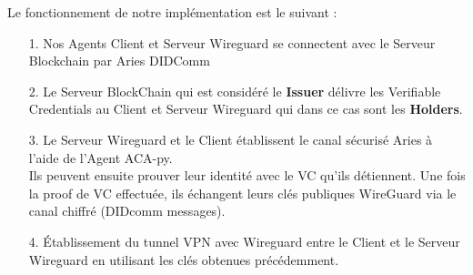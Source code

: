 \documentclass[12pt, openany]{report}
\begin{document}
\begin{flushleft}
Le fonctionnement de notre implémentation est le suivant : 

\begin{itemize}
\color{green}
\item[1.] \color{black} Nos Agents Client et Serveur Wireguard se connectent avec le Serveur Blockchain par Aries DIDComm

\color{orange}
\item[2.] \color{black} Le Serveur BlockChain qui est considéré le \textbf{Issuer} délivre les Verifiable Credentials au Client et Serveur Wireguard qui dans ce cas sont les \textbf{Holders}.

\color{violet}
\item[3.] \color{black} Le Serveur Wireguard et le Client établissent le canal sécurisé Aries à l’aide de l’Agent ACA-py.\\
Ils peuvent ensuite prouver leur identité avec le VC qu’ils détiennent.
Une fois la proof de VC effectuée, ils échangent leurs clés publiques WireGuard via le canal chiffré (DIDcomm messages).

\color{red}
\item[4.] \color{black} Établissement du tunnel VPN avec Wireguard entre le Client et le Serveur Wireguard en utilisant les clés obtenues précédemment.

\end{itemize}


\end{flushleft}
\end{document}
